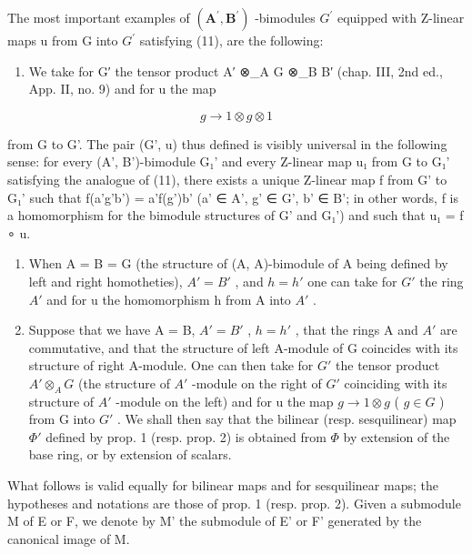 The most important examples of \((\mathbf{A}^{\prime}, \mathbf{B}^{\prime})\) -bimodules \(G^{\prime}\) equipped with Z-linear maps u from G into \(G^{\prime}\) satisfying (11), are the following:

\begin{enumerate}
\def\labelenumi{\arabic{enumi})}
\tightlist
\item
  We take for G′ the tensor product A′ ⊗\_A G ⊗\_B B′ (chap. III, 2nd ed., App. II, no. 9) and for u the map
\end{enumerate}

\[
g \to 1 \otimes g \otimes 1\tag{\(g\in G\)}
\]

from G to G'. The pair (G', u) thus defined is visibly universal in the following sense: for every (A', B')-bimodule G₁' and every Z-linear map u₁ from G to G₁' satisfying the analogue of (11), there exists a unique Z-linear map f from G' to G₁' such that f(a'g'b') = a'f(g')b' (a' ∈ A', g' ∈ G', b' ∈ B'; in other words, f is a homomorphism for the bimodule structures of G' and G₁') and such that u₁ = f ∘ u.

\begin{enumerate}
\def\labelenumi{\arabic{enumi})}
\setcounter{enumi}{1}
\item
  When A = B = G (the structure of (A, A)-bimodule of A being defined by left and right homotheties), \(A' = B'\) , and \(h = h'\) one can take for \(G'\) the ring \(A'\) and for u the homomorphism h from A into \(A'\) .
\item
  Suppose that we have A = B, \(A' = B'\) , \(h = h'\) , that the rings A and \(A'\) are commutative, and that the structure of left A-module of G coincides with its structure of right A-module. One can then take for \(G'\) the tensor product \(A' \otimes_{A} G\) (the structure of \(A'\) -module on the right of \(G'\) coinciding with its structure of \(A'\) -module on the left) and for u the map \(g \to 1 \otimes g\) ( \(g \in G\) ) from G into \(G'\) . We shall then say that the bilinear (resp. sesquilinear) map \(\Phi'\) defined by prop. 1 (resp. prop. 2) is obtained from \(\Phi\) by extension of the base ring, or by extension of scalars.
\end{enumerate}

What follows is valid equally for bilinear maps and for sesquilinear maps; the hypotheses and notations are those of prop. 1 (resp. prop. 2). Given a submodule M of E or F, we denote by M' the submodule of E' or F' generated by the canonical image of M.

